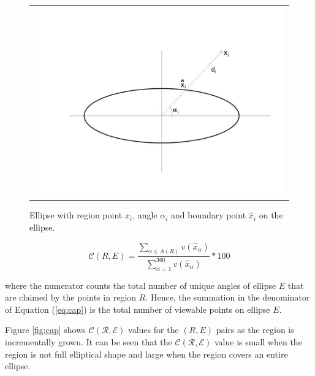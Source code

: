 \documentclass[preprint]{iucr}              %
\begin{document}
\begin{figure}
\centering
\begin{tabular}{c}
\includegraphics[width=.8\linewidth]{Figures/Ellipse_fig_new1.jpg}     
\end{tabular}
\caption{Ellipse with region point $x_i$, angle $\alpha_i$ and boundary point
$\hat{x}_i$ on the ellipse.} 
\label{fig:ellipse}
\end{figure}

\begin{equation} \label{eq:cap}
    \mathcal{C}(R,E) = \frac{\sum_{\alpha \in A(R)} v(\hat{x}_\alpha)} {\sum_{\alpha = 1}^{360} v(\hat{x}_\alpha)} * 100
\end{equation}

where the numerator counts the total number of unique angles of ellipse $E$ that
are claimed by the points in region $R$. 
Hence, the summation in the denominator of Equation (\ref{eq:cap}) is the total
number of viewable points on ellipse $E$. 

Figure \ref{fig:cap} shows $\mathcal{C(R,E)}$ values for the $(R, E)$ pairs as
the region is incrementally grown. 
It can be seen that the $\mathcal{C(R,E)}$ value is small when the region is not
full elliptical shape and large when the region covers an entire ellipse. 
\end{document}
